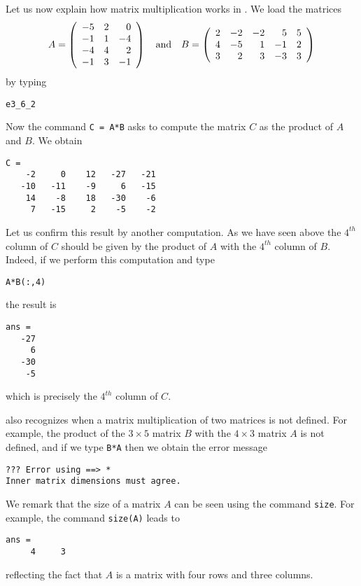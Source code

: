 Let us now explain how matrix multiplication works in \Matlabp.
We load the matrices
\begin{equation*}  \label{examp_AB}
A=\left(\begin{array}{rrr} -5  &  2  &  0\\
               -1  &  1  & -4\\
               -4  &  4  &  2\\
               -1  &  3  & -1 \end{array}\right) \quad\mbox{and}\quad
B =\left(\begin{array}{rrrrr}      2  & -2  & -2  &  5  &  5\\
                    4  & -5  &  1  & -1  &  2\\
                    3  &  2  &  3  & -3  &  3
 \end{array}\right)
\end{equation*}%
by typing
\begin{verbatim}
e3_6_2
\end{verbatim}
Now the command {\tt C = A*B} \index{\computer!*} asks \Matlab to compute
the matrix $C$ as the product of $A$ and $B$.  We obtain
\begin{verbatim}
C =
    -2     0    12   -27   -21
   -10   -11    -9     6   -15
    14    -8    18   -30    -6
     7   -15     2    -5    -2
\end{verbatim}
Let us confirm this result by another computation.  As we have
seen above the $4^{th}$ column of $C$ should be given by the
product of $A$ with the $4^{th}$ column of $B$.  Indeed, if we
perform this computation and type
\begin{verbatim}
A*B(:,4)
\end{verbatim}
the result is
\begin{verbatim}
ans =
   -27
     6
   -30
    -5
\end{verbatim}
which is precisely the $4^{th}$ column of $C$.

\Matlab also recognizes when a matrix multiplication of two
matrices is not defined.  For example, the product of
the $3\times 5$ matrix $B$ with the $4\times 3$ matrix $A$
is not defined, and if we type {\tt B*A} then we obtain the
error message
\begin{verbatim}
??? Error using ==> *
Inner matrix dimensions must agree.
\end{verbatim}
We remark that the size of a matrix $A$ can be seen using
the \Matlab command {\tt size}.
For example, the command {\tt size(A)} leads to
\begin{verbatim}
ans =
     4     3
\end{verbatim}
reflecting the fact that $A$ is a matrix with four
rows and three columns.



